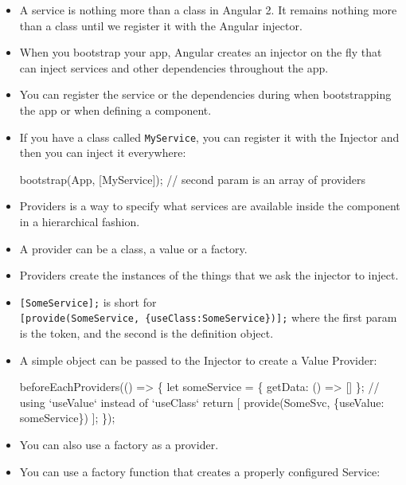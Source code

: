 \documentclass[12pt,]{article}
\newenvironment{Shaded}{}{}
\newcommand{\KeywordTok}[1]{\textcolor[rgb]{0.00,0.00,1.00}{{#1}}}
\newcommand{\CommentTok}[1]{\textcolor[rgb]{0.00,0.50,0.00}{{#1}}}
\newcommand{\FunctionTok}[1]{{#1}}
\newcommand{\NormalTok}[1]{{#1}}
\begin{document}
\begin{itemize}
\item
  A service is nothing more than a class in Angular 2. It remains
  nothing more than a class until we register it with the Angular
  injector.
\item
  When you bootstrap your app, Angular creates an injector on the fly
  that can inject services and other dependencies throughout the app.
\item
  You can register the service or the dependencies during when
  bootstrapping the app or when defining a component.
\item
  If you have a class called \texttt{MyService}, you can register it
  with the Injector and then you can inject it everywhere:

\begin{Shaded}
\begin{Highlighting}[numbers=left,,]
\FunctionTok{bootstrap}\NormalTok{(App, [MyService]); }\CommentTok{// second param is an array of providers}
\end{Highlighting}
\end{Shaded}
\item
  Providers is a way to specify what services are available inside the
  component in a hierarchical fashion.
\item
  A provider can be a class, a value or a factory.
\item
  Providers create the instances of the things that we ask the injector
  to inject.
\item
  \texttt{{[}SomeService{]};} is short for
  \texttt{{[}provide(SomeService,\ \{useClass:SomeService\}){]};} where
  the first param is the token, and the second is the definition object.
\item
  A simple object can be passed to the Injector to create a Value
  Provider:

\begin{Shaded}
\begin{Highlighting}[numbers=left,,]
\FunctionTok{beforeEachProviders}\NormalTok{(() => \{}
  \NormalTok{let someService = \{ getData: () => [] \};}
  \CommentTok{// using `useValue` instead of `useClass`}
  \KeywordTok{return} \NormalTok{[ }\FunctionTok{provide}\NormalTok{(SomeSvc, \{useValue: someService\}) ];}
\NormalTok{\});}
\end{Highlighting}
\end{Shaded}
\item
  You can also use a factory as a provider.
\item
  You can use a factory function that creates a properly configured
  Service:


\end{itemize}
\end{document}
